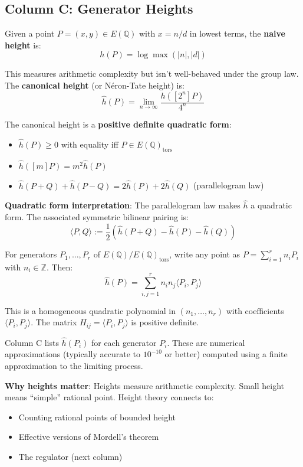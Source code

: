 \documentclass[11pt]{article}
\begin{document}
\subsection{Column C: Generator Heights}

Given a point $P = (x, y) \in E(\mathbb{Q})$ with $x = n/d$ in lowest terms, the \textbf{naive height} is:
$$h(P) = \log \max(|n|, |d|)$$

This measures arithmetic complexity but isn't well-behaved under the group law. The \textbf{canonical height} (or Néron-Tate height) is:
$$\hat{h}(P) = \lim_{n \to \infty} \frac{h([2^n]P)}{4^n}$$

The canonical height is a \textbf{positive definite quadratic form}:
\begin{itemize}
\item $\hat{h}(P) \geq 0$ with equality iff $P \in E(\mathbb{Q})_{\text{tors}}$
\item $\hat{h}([m]P) = m^2 \hat{h}(P)$
\item $\hat{h}(P+Q) + \hat{h}(P-Q) = 2\hat{h}(P) + 2\hat{h}(Q)$ (parallelogram law)
\end{itemize}

\textbf{Quadratic form interpretation}: The parallelogram law makes $\hat{h}$ a quadratic form. The associated symmetric bilinear pairing is:
$$\langle P, Q \rangle := \frac{1}{2}(\hat{h}(P+Q) - \hat{h}(P) - \hat{h}(Q))$$

For generators $P_1, \ldots, P_r$ of $E(\mathbb{Q})/E(\mathbb{Q})_{\text{tors}}$, write any point as $P = \sum_{i=1}^r n_i P_i$ with $n_i \in \mathbb{Z}$. Then:
$$\hat{h}(P) = \sum_{i,j=1}^r n_i n_j \langle P_i, P_j \rangle$$

This is a homogeneous quadratic polynomial in $(n_1, \ldots, n_r)$ with coefficients $\langle P_i, P_j \rangle$. The matrix $H_{ij} = \langle P_i, P_j \rangle$ is positive definite.

Column C lists $\hat{h}(P_i)$ for each generator $P_i$. These are numerical approximations (typically accurate to $10^{-10}$ or better) computed using a finite approximation to the limiting process.

\textbf{Why heights matter}: Heights measure arithmetic complexity. Small height means ``simple'' rational point. Height theory connects to:
\begin{itemize}
\item Counting rational points of bounded height
\item Effective versions of Mordell's theorem
\item The regulator (next column)
\end{itemize}
\end{document}
